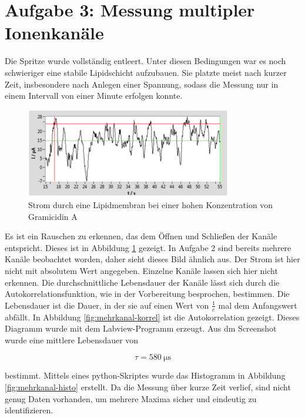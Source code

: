 \documentclass[a4paper,ngerman]{scrartcl}
\begin{document}
\section{Aufgabe 3: Messung multipler Ionenkanäle}

Die Spritze wurde vollständig entleert. Unter diesen Bedingungen war es noch schwieriger eine stabile Lipidschicht aufzubauen.
Sie platzte meist nach kurzer Zeit, insbesondere nach Anlegen einer Spannung, sodass die Messung nur in einem Intervall von einer Minute erfolgen konnte.

\begin{figure}[tbh!]
\includegraphics[width=0.8\textwidth]{abbildungen/mehrkanal_raw.png}
\caption{Strom durch eine Lipidmembran bei einer hohen Konzentration von Gramicidin A}
\label{fig:mehrkanal-roh}
\end{figure}


Es ist ein Rauschen zu erkennen, das dem Öffnen und Schließen der Kanäle entspricht. Dieses ist in Abbildung \ref{fig:mehrkanal-roh} gezeigt. In Aufgabe 2 sind bereits mehrere Kanäle beobachtet worden, daher sieht dieses Bild ähnlich aus. Der Strom ist hier nicht mit absolutem Wert angegeben. Einzelne Kanäle lassen sich hier nicht erkennen. Die durchschnittliche Lebensdauer der Kanäle lässt sich durch die Autokorrelationsfunktion, wie in der Vorbereitung besprochen, bestimmen. Die Lebensdauer ist die Dauer, in der sie auf einen Wert von $\frac{1}{e}$ mal dem Anfangswert abfällt. In Abbildung \ref{fig:mehrkanal-korrel} ist die Autokorrelation gezeigt. Dieses Diagramm wurde mit dem Labview-Programm erzeugt. Aus dm Screenshot wurde eine mittlere Lebensdauer von

\begin{equation}
\label{eqn:tau_mehrkanal}
\tau = \SI{580}{\micro\s}
\end{equation}

bestimmt.
Mittels eines python-Skriptes wurde das Histogramm in Abbildung \ref{fig:mehrkanal-histo} erstellt. Da die Messung über kurze Zeit verlief, sind nicht genug Daten vorhanden, um mehrere Maxima sicher und eindeutig zu identifizieren. 
\end{document}
